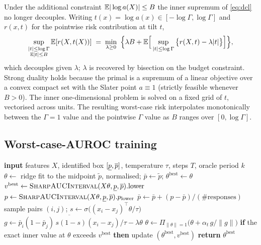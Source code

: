 Under the additional constraint $\mathbb{E}|\log a(X)|\le B$ the inner supremum of
\eqref{eq:dcl} no longer decouples. Writing $t(x)=\log a(x)\in[-\log\Gamma,\log\Gamma]$
and $r(x,t)$ for the pointwise risk contribution at tilt $t$,
\[
  \sup_{\substack{|t|\le\log\Gamma\\ \mathbb{E}|t|\le B}} \mathbb{E}[r(X,t(X))]
  \;=\;
  \min_{\lambda\ge0}\ \Big\{\lambda B
  + \mathbb{E}\Big[\sup_{|t|\le\log\Gamma}\big\{r(X,t)-\lambda|t|\big\}\Big]\Big\},
\]
which decouples given $\lambda$; $\lambda$ is recovered by bisection on the
budget constraint. Strong duality holds because the primal is a supremum of a
linear objective over a convex compact set with the Slater point $a\equiv1$
(strictly feasible whenever $B>0$). The inner one-dimensional problem is solved
on a fixed grid of $t$, vectorised across units. The resulting worst-case risk
interpolates monotonically between the $\Gamma=1$ value and the pointwise
$\Gamma$ value as $B$ ranges over $[0,\log\Gamma]$.

\subsection{Worst-case-AUROC training}
\label{app:ranking-alg}

\begin{algorithm}[h]
\caption{\textsc{DCLRanker} --- worst-case AUROC by exact best response}
\label{alg:ranker}
\begin{algorithmic}[1]
\State \textbf{input} features $X$, identified box $[\underline{p},\overline{p}]$, temperature
  $\tau$, steps $T$, oracle period $k$
\State $\theta \gets$ ridge fit to the midpoint $\tilde p$, normalised;
  $\bar p \gets \tilde p$; $\theta^{\text{best}}\gets\theta$
\State $v^{\text{best}} \gets \textsc{SharpAUCInterval}(X\theta,\underline{p},\overline{p}).\text{lower}$
    \State $p \gets \textsc{SharpAUCInterval}(X\theta,\underline{p},\overline{p}).p_{\text{lower}}$
    \State $\bar p \gets \bar p + (p - \bar p)/(\text{\#responses})$
  \EndIf
  \State sample pairs $(i,j)$; $s \gets \sigma\big((x_i-x_j)^\top\theta/\tau\big)$
  \State $g \gets \overline{\bar p_i(1-\bar p_j)\,s(1-s)(x_i-x_j)}/\tau - \lambda\theta$
  \State $\theta \gets \Pi_{\|\theta\|=1}\big(\theta + \alpha_t\, g/\|g\|\big)$
  \State \textbf{if} the exact inner value at $\theta$ exceeds $v^{\text{best}}$
    \textbf{then} update $(\theta^{\text{best}}, v^{\text{best}})$
\EndFor
\State \textbf{return} $\theta^{\text{best}}$
\end{algorithmic}
\end{algorithm}

